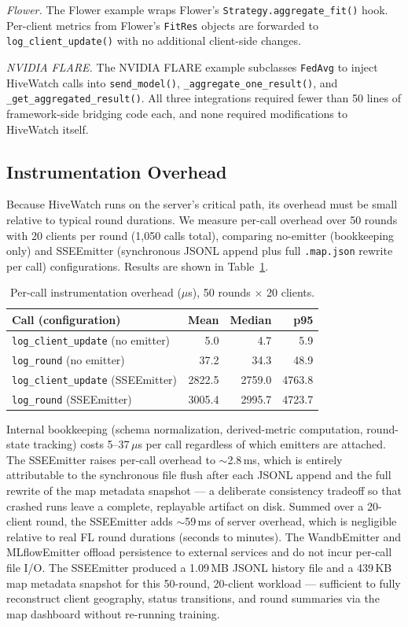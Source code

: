 \textit{Flower.} The Flower example wraps Flower's \texttt{Strategy.aggregate\_fit()} hook. Per-client metrics from Flower's \texttt{FitRes} objects are forwarded to \texttt{log\_client\_update()} with no additional client-side changes.

\textit{NVIDIA FLARE.} The NVIDIA FLARE example subclasses \texttt{FedAvg} to inject HiveWatch calls into \texttt{send\_model()}, \texttt{\_aggregate\_one\_result()}, and \texttt{\_get\_aggregated\_result()}. All three integrations required fewer than 50 lines of framework-side bridging code each, and none required modifications to HiveWatch itself.

\subsection{Instrumentation Overhead}

Because HiveWatch runs on the server's critical path, its overhead must be small relative to typical round durations. We measure per-call overhead over 50 rounds with 20 clients per round (1{,}050 calls total), comparing no-emitter (bookkeeping only) and SSEEmitter (synchronous JSONL append plus full \texttt{.map.json} rewrite per call) configurations. Results are shown in Table~\ref{tab:overhead}.

\begin{table}[t]
\caption{Per-call instrumentation overhead ($\mu$s), 50 rounds $\times$ 20 clients.}
\label{tab:overhead}
\centering
\begin{tabular}{lrrr}
\toprule
\textbf{Call (configuration)} & \textbf{Mean} & \textbf{Median} & \textbf{p95} \\
\midrule
\texttt{log\_client\_update} (no emitter) & 5.0 & 4.7 & 5.9 \\
\texttt{log\_round} (no emitter)           & 37.2 & 34.3 & 48.9 \\
\texttt{log\_client\_update} (SSEEmitter)  & 2822.5 & 2759.0 & 4763.8 \\
\texttt{log\_round} (SSEEmitter)           & 3005.4 & 2995.7 & 4723.7 \\
\bottomrule
\end{tabular}
\end{table}

Internal bookkeeping (schema normalization, derived-metric computation, round-state tracking) costs 5--37\,$\mu$s per call regardless of which emitters are attached. The SSEEmitter raises per-call overhead to $\sim$2.8\,ms, which is entirely attributable to the synchronous file flush after each JSONL append and the full rewrite of the map metadata snapshot — a deliberate consistency tradeoff so that crashed runs leave a complete, replayable artifact on disk. Summed over a 20-client round, the SSEEmitter adds $\sim$59\,ms of server overhead, which is negligible relative to real FL round durations (seconds to minutes). The WandbEmitter and MLflowEmitter offload persistence to external services and do not incur per-call file I/O. The SSEEmitter produced a 1.09\,MB JSONL history file and a 439\,KB map metadata snapshot for this 50-round, 20-client workload — sufficient to fully reconstruct client geography, status transitions, and round summaries via the map dashboard without re-running training.
